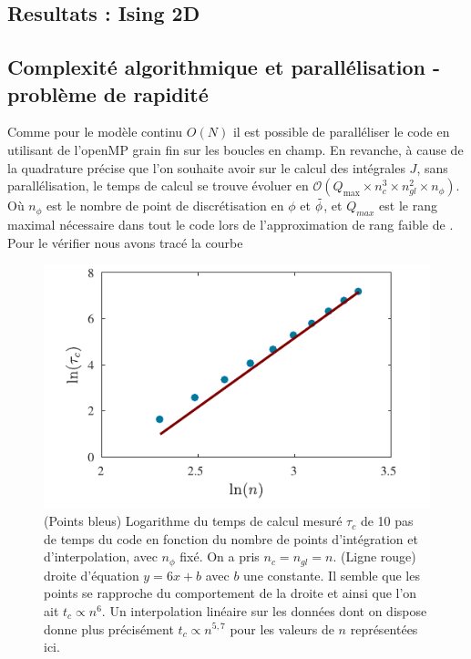 \documentclass[10.5pt]{article}
\begin{document}
\begin{multicols}{2}
\section{Resultats : Ising 2D}
\label{sec:ResIsing}
\subsection{Complexité algorithmique et parallélisation - problème de rapidité} 

Comme pour le modèle continu $O(N)$ il est possible de paralléliser le code en utilisant de l'openMP \cite{openmp2002c++} grain fin sur les boucles en champ. En revanche, à cause de la quadrature précise que l'on souhaite avoir sur le calcul des intégrales $J$, sans parallélisation, le temps de calcul se trouve évoluer en $\mathcal{O}( Q_\text{max} \times n_c^3 \times n_{gl}^2 \times n_{\phi})$. Où $n_{\phi}$ est le nombre de point de discrétisation en $\phi$ et $\tilde{\phi}$, et $Q_{max}$ est le rang maximal nécessaire dans tout le code lors de l'approximation de rang faible de . Pour le vérifier nous avons tracé la courbe 


\begin{figure}[H]
\begin{center}
	\includegraphics[width=0.95\columnwidth]{ComplexiteTemps.pdf}
\end{center}
\caption{(Points bleus) Logarithme du temps de calcul mesuré $\tau_c$ de 10 pas de temps du code en fonction du nombre de points d'intégration et d'interpolation, avec $n_\phi$ fixé. On a pris $n_c = n_{gl} = n$. (Ligne rouge) droite d'équation $y=6x+b$ avec $b$ une constante. Il semble que les points se rapproche du comportement de la droite et ainsi que l'on ait $t_c \propto n^6$. Un interpolation linéaire sur les données dont on dispose donne plus précisément $t_c \propto n^{5,7}$ pour les valeurs de $n$ représentées ici.}
\label{fig:timeNc}
\end{figure}



\end{multicols}
\end{document}
